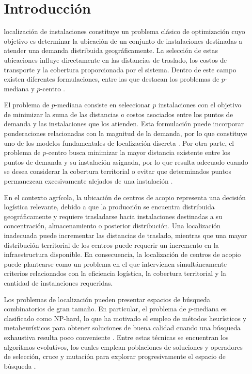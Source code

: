 \documentclass[journal]{IEEEtran}
\begin{document}
\IEEEpeerreviewmaketitle



\section{Introducción}


 localización de instalaciones constituye un problema clásico de optimización cuyo objetivo es determinar la ubicación de un conjunto de instalaciones destinadas a atender una demanda distribuida geográficamente. La selección de estas ubicaciones influye directamente en las distancias de traslado, los costos de transporte y la cobertura proporcionada por el sistema. Dentro de este campo existen diferentes formulaciones, entre las que destacan los problemas de $p$-mediana y $p$-centro \cite{mladenovic2007pmedian,farahani2010facility}.

El problema de $p$-mediana consiste en seleccionar $p$ instalaciones con el objetivo de minimizar la suma de las distancias o costos asociados entre los puntos de demanda y las instalaciones que los atienden. Esta formulación puede incorporar ponderaciones relacionadas con la magnitud de la demanda, por lo que constituye uno de los modelos fundamentales de localización discreta \cite{mladenovic2007pmedian}. Por otra parte, el problema de $p$-centro busca minimizar la mayor distancia existente entre los puntos de demanda y su instalación asignada, por lo que resulta adecuado cuando se desea considerar la cobertura territorial o evitar que determinados puntos permanezcan excesivamente alejados de una instalación \cite{farahani2010facility}.

En el contexto agrícola, la ubicación de centros de acopio representa una decisión logística relevante, debido a que la producción se encuentra distribuida geográficamente y requiere trasladarse hacia instalaciones destinadas a su concentración, almacenamiento o posterior distribución. Una localización inadecuada puede incrementar las distancias de traslado, mientras que una mayor distribución territorial de los centros puede requerir un incremento en la infraestructura disponible. En consecuencia, la localización de centros de acopio puede plantearse como un problema en el que intervienen simultáneamente criterios relacionados con la eficiencia logística, la cobertura territorial y la cantidad de instalaciones requeridas.

Los problemas de localización pueden presentar espacios de búsqueda combinatorios de gran tamaño. En particular, el problema de $p$-mediana es clasificado como NP-hard, lo que ha motivado el empleo de métodos heurísticos y metaheurísticos para obtener soluciones de buena calidad cuando una búsqueda exhaustiva resulta poco conveniente \cite{mladenovic2007pmedian}. Entre estas técnicas se encuentran los algoritmos evolutivos, los cuales emplean poblaciones de soluciones y operadores de selección, cruce y mutación para explorar progresivamente el espacio de búsqueda \cite{eiben2015introduction}.
\end{document}
